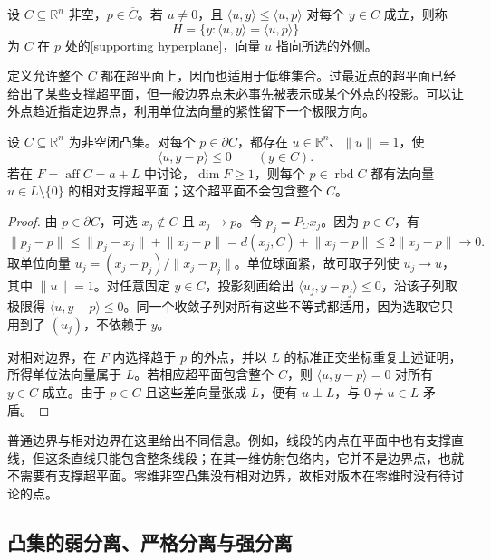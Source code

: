 \begin{definition}\label{g1:def:supporting-hyperplane}
	设 \(C\subseteq\mathbb R^n\) 非空，\(p\in\overline C\)。若 \(u\ne0\)，且 \(\langle u,y\rangle\leq\langle u,p\rangle\) 对每个 \(y\in C\) 成立，则称
	\[
		H=\{y:\langle u,y\rangle=\langle u,p\rangle\}
	\]
	为 \(C\) 在 \(p\) 处的[supporting hyperplane]，向量 \(u\) 指向所选的外侧。
\end{definition}

定义允许整个 \(C\) 都在超平面上，因而也适用于低维集合。过最近点的超平面已经给出了某些支撑超平面，但一般边界点未必事先被表示成某个外点的投影。可以让外点趋近指定边界点，利用单位法向量的紧性留下一个极限方向。

\begin{theorem}\label{g1:thm:supporting-hyperplane}
	设 \(C\subseteq\mathbb R^n\) 为非空闭凸集。对每个 \(p\in\partial C\)，都存在 \(u\in\mathbb R^n\)、\(\lVert u\rVert=1\)，使
	\[
		\langle u,y-p\rangle\leq0\qquad(y\in C).
	\]
	若在 \(F=\operatorname{aff}C=a+L\) 中讨论，\(\dim F\geq1\)，则每个 \(p\in\operatorname{rbd}C\) 都有法向量 \(u\in L\setminus\{0\}\) 的相对支撑超平面；这个超平面不会包含整个 \(C\)。
\end{theorem}
\begin{proof}
	由 \(p\in\partial C\)，可选 \(x_j\notin C\) 且 \(x_j\to p\)。令 \(p_j=P_Cx_j\)。因为 \(p\in C\)，有
	\[
		\lVert p_j-p\rVert\leq\lVert p_j-x_j\rVert+\lVert x_j-p\rVert
		=d(x_j,C)+\lVert x_j-p\rVert\leq2\lVert x_j-p\rVert\to0.
	\]
	取单位向量 \(u_j=(x_j-p_j)/\lVert x_j-p_j\rVert\)。单位球面紧，故可取子列使 \(u_j\to u\)，其中 \(\lVert u\rVert=1\)。对任意固定 \(y\in C\)，投影刻画给出 \(\langle u_j,y-p_j\rangle\leq0\)，沿该子列取极限得 \(\langle u,y-p\rangle\leq0\)。同一个收敛子列对所有这些不等式都适用，因为选取它只用到了 \((u_j)\)，不依赖于 \(y\)。

	对相对边界，在 \(F\) 内选择趋于 \(p\) 的外点，并以 \(L\) 的标准正交坐标重复上述证明，所得单位法向量属于 \(L\)。若相应超平面包含整个 \(C\)，则 \(\langle u,y-p\rangle=0\) 对所有 \(y\in C\) 成立。由于 \(p\in C\) 且这些差向量张成 \(L\)，便有 \(u\perp L\)，与 \(0\ne u\in L\) 矛盾。
\end{proof}

普通边界与相对边界在这里给出不同信息。例如，线段的内点在平面中也有支撑直线，但这条直线只能包含整条线段；在其一维仿射包络内，它并不是边界点，也就不需要有支撑超平面。零维非空凸集没有相对边界，故相对版本在零维时没有待讨论的点。

\subsection{凸集的弱分离、严格分离与强分离}
\label{g1:subsec:0301:03}

